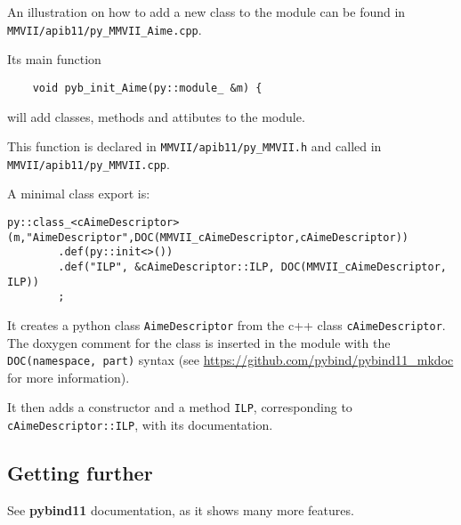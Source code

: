 An illustration on how to add a new class to the module can be found in \texttt{MMVII/apib11/py\_MMVII\_Aime.cpp}.

Its main function
\begin{lstlisting}
    void pyb_init_Aime(py::module_ &m) {
\end{lstlisting}
will add classes, methods and attibutes to the module.

This function is declared in \texttt{MMVII/apib11/py\_MMVII.h} and called in \texttt{MMVII/apib11/py\_MMVII.cpp}.

A minimal class export is:
\begin{lstlisting}
py::class_<cAimeDescriptor>(m,"AimeDescriptor",DOC(MMVII_cAimeDescriptor,cAimeDescriptor))
        .def(py::init<>())
        .def("ILP", &cAimeDescriptor::ILP, DOC(MMVII_cAimeDescriptor, ILP))
        ;
\end{lstlisting}

It creates a python class \texttt{AimeDescriptor} from the c++ class \texttt{cAimeDescriptor}.
The doxygen comment for the class is inserted in the module with the \texttt{DOC(namespace, part)} syntax
(see \url{https://github.com/pybind/pybind11_mkdoc} for more information).

It then adds a constructor and a method \texttt{ILP}, corresponding to \texttt{cAimeDescriptor::ILP}, with its documentation.

\subsection{Getting further}

See \textbf{pybind11} documentation, as it shows many more features.

